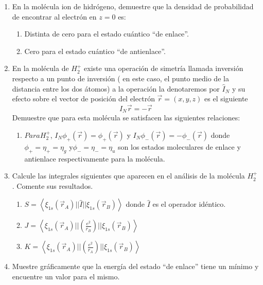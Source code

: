 \documentclass[]{article}
\begin{document}
\begin{enumerate}
\item En la molécula ion de hidrógeno, demuestre que la densidad de probabilidad de encontrar al electrón en $z=0$ es:
  \begin{enumerate}
  \item Distinta de cero para el estado cuántico ``de enlace''.
  \item Cero para el estado cuántico ``de antienlace''.
  \end{enumerate}
\item  En la molécula de $H_2^+$ existe una operación de simetría llamada inversión respecto a un punto de inversión ( en este caso, el punto medio  de la distancia entre los dos átomos) a la operación la denotaremos por $\hat{I}_N$ y su efecto sobre el vector de posición del electrón $\vec{r}=(x,y,z)$ es el siguiente
$$
\hat{I}_N\vec{r}=-\vec{r}
$$
Demuestre que para  esta molécula se satisfacen las siguientes relaciones:
\begin{enumerate}
\item $Para H_2^+$, $I_N\phi_+(\vec{r})=\phi_+(\vec{r})$ y $I_N\phi_-(\vec{r})=-\phi_-(\vec{r})$ donde $\phi_+=\eta_+=\eta_g$ y$\phi_-=\eta_-=\eta_u$ son los estados moleculares de enlace y antienlace respectivamente para la molécula.
\end{enumerate}
\item Calcule las integrales siguientes que aparecen en el análisis de la molécula $H_2^+$. Comente sus resultados.
  \begin{enumerate}
  \item $S=\left<\xi_{1s}\left(\vec{r}_A\right)||\hat{I}||\xi_{1s}\left(\vec{r}_B\right)\right>$ donde $\hat{I}$ es el operador idéntico.
  \item $J=\left<\xi_{1s}\left(\vec{r}_A\right)||\left(\frac{e^2}{r_B}\right)||\xi_{1s}\left(\vec{r}_B\right)\right>$
  \item $K=\left<\xi_{1s}\left(\vec{r}_A\right)||\left(\frac{e^2}{r_A}\right)||\xi_{1s}\left(\vec{r}_B\right)\right>$
  \end{enumerate}
\item Muestre gráficamente que la energía del estado ``de enlace'' tiene un mínimo y encuentre un valor para el mismo.

\end{enumerate}
\end{document}
